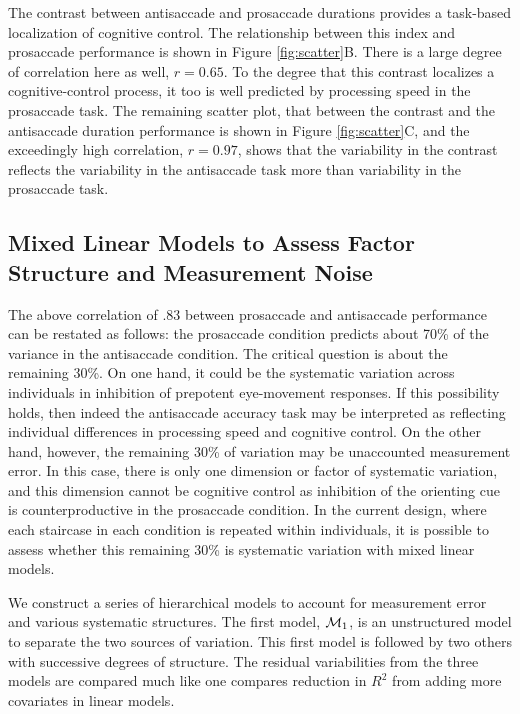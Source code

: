 \documentclass[
  ,man,floatsintext]{apa6}
\begin{document}
The contrast between antisaccade and prosaccade durations provides a task-based localization of cognitive control. The relationship between this index and prosaccade performance is shown in Figure \ref{fig:scatter}B. There is a large degree of correlation here as well, \(r=0.65\). To the degree that this contrast localizes a cognitive-control process, it too is well predicted by processing speed in the prosaccade task. The remaining scatter plot, that between the contrast and the antisaccade duration performance is shown in Figure \ref{fig:scatter}C, and the exceedingly high correlation, \(r=0.97\), shows that the variability in the contrast reflects the variability in the antisaccade task more than variability in the prosaccade task.

\hypertarget{mixed-linear-models-to-assess-factor-structure-and-measurement-noise}{%
\subsection{Mixed Linear Models to Assess Factor Structure and Measurement Noise}\label{mixed-linear-models-to-assess-factor-structure-and-measurement-noise}}

The above correlation of .83 between prosaccade and antisaccade performance can be restated as follows: the prosaccade condition predicts about 70\% of the variance in the antisaccade condition. The critical question is about the remaining 30\%. On one hand, it could be the systematic variation across individuals in inhibition of prepotent eye-movement responses. If this possibility holds, then indeed the antisaccade accuracy task may be interpreted as reflecting individual differences in processing speed and cognitive control. On the other hand, however, the remaining 30\% of variation may be unaccounted measurement error. In this case, there is only one dimension or factor of systematic variation, and this dimension cannot be cognitive control as inhibition of the orienting cue is counterproductive in the prosaccade condition. In the current design, where each staircase in each condition is repeated within individuals, it is possible to assess whether this remaining 30\% is systematic variation with mixed linear models.

We construct a series of hierarchical models to account for measurement error and various systematic structures. The first model, \({\cal M}_1\), is an unstructured model to separate the two sources of variation. This first model is followed by two others with successive degrees of structure. The residual variabilities from the three models are compared much like one compares reduction in \(R^2\) from adding more covariates in linear models.
\end{document}
